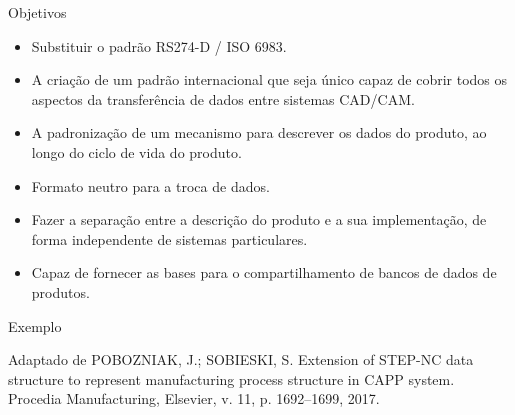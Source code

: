 \documentclass[aspectratio=169]{beamer}
\begin{document}
{%

\begin{frame}{Objetivos}
  \begin{itemize}
    \item {
      Substituir o padrão RS274-D / ISO 6983.
    }
    \item{
      A criação de um padrão internacional que seja único capaz de cobrir todos os aspectos 
      da transferência de dados entre sistemas CAD/CAM.
    }
    \item {
      A padronização de um mecanismo para descrever os dados do produto, ao longo do ciclo de 
      vida do produto.
    }
    \item {
      Formato neutro para a troca de dados.
    }
    \item {
      Fazer a separação entre a descrição do produto e a sua implementação, 
      de forma independente de sistemas particulares.
    }
    \item {
      Capaz de fornecer as bases para o compartilhamento de bancos de dados de produtos.
    }
  \end{itemize}
\end{frame}



\begin{frame}{Exemplo}

  Adaptado de POBOZNIAK, J.; SOBIESKI, S. Extension of STEP-NC data structure to represent
  manufacturing process structure in CAPP system. Procedia Manufacturing, Elsevier,
  v. 11, p. 1692–1699, 2017.


\end{frame}}
\end{document}
